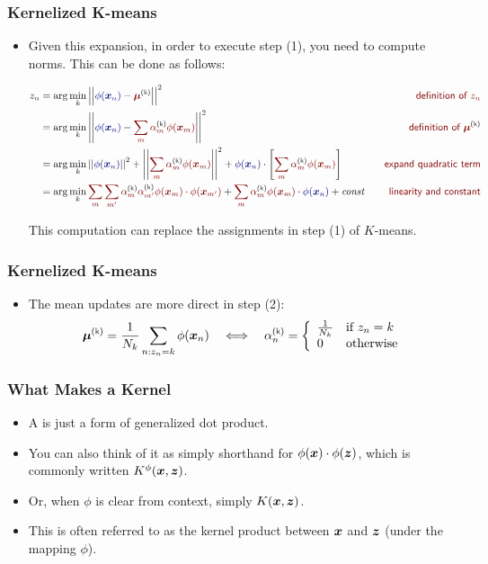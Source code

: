 \documentclass[trans]{beamer}
\begin{document}
\begin{frame}
  \frametitle{Kernelized K-means}
\begin{itemize}
\item 
Given this expansion, in order to execute step (1), you need to
compute norms.  This can be done as follows:
%
\begin{tiny}
\begin{align}
z_n 
&= \arg\min_k \norm{\textcolor{darkblue}{\phi(\vx_n)} - \textcolor{darkred}{\vec\mu\kth}}^2
   \becauseof{definition of $z_n$} \\
&= \arg\min_k \norm{\textcolor{darkblue}{\phi(\vx_n)} - \textcolor{darkred}{\sum_m \al\kth_m \phi(\vx_m)}}^2
   \becauseof{definition of $\vec\mu\kth$} \\
&= \arg\min_k \norm{\textcolor{darkblue}{\phi(\vx_n)}}^2+ \norm{\textcolor{darkred}{\sum_m \al\kth_m \phi(\vx_m)}}^2
   + \dotp{\textcolor{darkblue}{\phi(\vx_n)}}{\left[ \textcolor{darkred}{\sum_m \al\kth_m \phi(\vx_m)} \right]}
   \becauseof{expand quadratic term} \\
&= \arg\min_k \textcolor{darkred}{\sum_m \sum_{m'} \al\kth_m \al\kth_{m'} \dotp{\phi(\vx_m)}{\phi(\vx_{m'})}}
   + \textcolor{darkred}{\sum_m \al\kth_m} \dotp{\textcolor{darkred}{\phi(\vx_m)}}{\textcolor{darkblue}{\phi(\vx_n)}}
   + \textit{const}
   \becauseof{linearity and constant}
\end{align}
\end{tiny}
%
This computation can replace the assignments in step (1) of
$K$-means. 
\end{itemize}
\end{frame}
\begin{frame}
  \frametitle{Kernelized K-means}
\begin{itemize}
\item 
 The mean updates are more direct in step (2):
%
\begin{align}
\vec\mu\kth = \frac 1 {N_k} \sum_{n : z_n=k} \phi(\vx_n)
\quad\Longleftrightarrow\quad
\al\kth_n = \brack{\frac 1 {N_k} & \text{if } z_n = k \\ 0 & \text{otherwise}}
\end{align}
\end{itemize}
\end{frame}

\begin{frame}
  \frametitle{What Makes a Kernel}
\begin{itemize}
\item 
A  is just a form of generalized dot product.
\item  You can
also think of it as simply shorthand for
$\phi({\boldsymbol{x}}) \cdot \phi({\boldsymbol{z}})$, which is commonly written
$K^\phi({\boldsymbol{x}},{\boldsymbol{z}})$.
\item  Or, when $\phi$ is clear from context, simply
$K({\boldsymbol{x}},{\boldsymbol{z}})$.
\item   This is often referred to as the kernel product between
${\boldsymbol{x}}$ and ${\boldsymbol{z}}$ (under the mapping $\phi$).
\end{itemize}
\end{frame}
\end{document}
